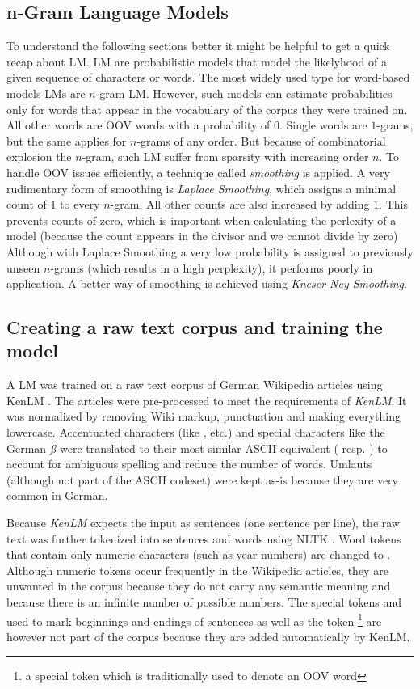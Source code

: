 \subsection{n-Gram Language Models}

To understand the following sections better it might be helpful to get a quick recap about \ac{LM}. \ac{LM} are probabilistic models that model the likelyhood of a given sequence of characters or words. The most widely used type for word-based models \ac{LM}s are $n$-gram \ac{LM}. However, such models can estimate probabilities only for words that appear in the vocabulary of the corpus they were trained on. All other words are \ac{OOV} words with a probability of $0$. Single words are $1$-grams, but the same applies for $n$-grams of any order. But because of combinatorial explosion the $n$-gram, such \ac{LM} suffer from sparsity with increasing order $n$. To handle \ac{OOV} issues efficiently, a technique called \textit{smoothing} is applied. A very rudimentary form of smoothing is \textit{Laplace Smoothing}, which assigns a minimal count of $1$ to every $n$-gram. All other counts are also increased by adding $1$. This prevents counts of zero, which is important when calculating the perlexity of a model (because the count appears in the divisor and we cannot divide by zero) Although with Laplace Smoothing a very low probability is assigned to previously unseen $n$-grams (which results in a high perplexity), it performs poorly in application. A better way of smoothing is achieved using \textit{Kneser-Ney Smoothing}.

\subsection{Creating a raw text corpus and training the model}

A LM was trained on a raw text corpus of German Wikipedia articles using KenLM \parencite{kenlm}. The articles were pre-processed to meet the requirements of \textit{KenLM}.
It was normalized by removing Wiki markup, punctuation and making everything lowercase. Accentuated characters (like , etc.) and special characters like the German \textit{ß} were translated to their most similar ASCII-equivalent ( resp. ) to account for ambiguous spelling and reduce the number of words. Umlauts (although not part of the ASCII codeset) were kept as-is because they are very common in German.

Because \textit{KenLM} expects the input as sentences (one sentence per line), the raw text was further tokenized into sentences and words using NLTK \parencite{nltk}. Word tokens that contain only numeric characters (such as year numbers) are changed to . Although numeric tokens occur frequently in the Wikipedia articles, they are unwanted in the corpus because they do not carry any semantic meaning and because there is an infinite number of possible numbers. The special tokens  and  used to mark beginnings and endings of sentences as well as the  token \footnote{a special token which is traditionally used to denote an \ac{OOV} word} are however not part of the corpus because they are added automatically by KenLM.

